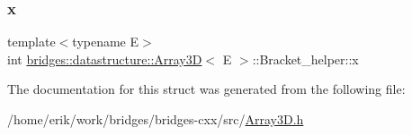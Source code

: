 \subsubsection{\texorpdfstring{x}{x}}
{\footnotesize\ttfamily template$<$typename E$>$ \\
int \hyperlink{classbridges_1_1datastructure_1_1_array3_d}{bridges\+::datastructure\+::\+Array3D}$<$ E $>$\+::Bracket\+\_\+helper\+::x}



The documentation for this struct was generated from the following file\+:\begin{DoxyCompactItemize}
\item 
/home/erik/work/bridges/bridges-\/cxx/src/\hyperlink{_array3_d_8h}{Array3\+D.\+h}\end{DoxyCompactItemize}
